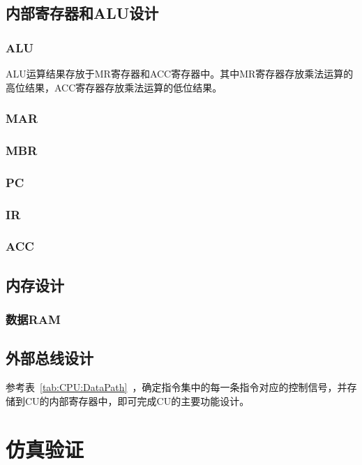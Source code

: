 \documentclass[lang=cn,a4paper,newtx]{elegantpaper}
\begin{document}
\subsection{内部寄存器和ALU设计}
\subsubsection{ALU}
ALU运算结果存放于MR寄存器和ACC寄存器中。其中MR寄存器存放乘法运算的高位结果，ACC寄存器存放乘法运算的低位结果。
\subsubsection{MAR}
\subsubsection{MBR}
\subsubsection{PC}
\subsubsection{IR}
\subsubsection{ACC}
\subsection{内存设计}
\subsubsection{数据RAM}
\subsection{外部总线设计}



参考表~\ref{tab:CPU:DataPath}~，确定指令集中的每一条指令对应的控制信号，并存储到CU的内部寄存器中，即可完成CU的主要功能设计。




\section{仿真验证}
\end{document}
